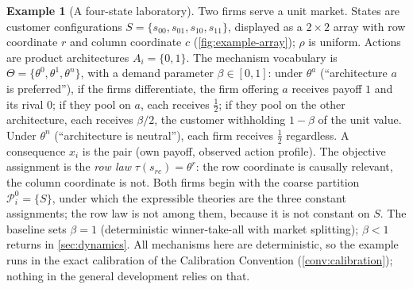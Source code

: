 \documentclass[11pt]{article}
\theoremstyle{definition}
\newtheorem{example}{Example}
\begin{document}
\begin{example}[A four-state laboratory]
\label{ex:setup}
Two firms serve a unit market.
States are customer configurations $S=\{s_{00},s_{01},s_{10},s_{11}\}$, displayed as a $2\times2$ array with row coordinate $r$ and column coordinate $c$ (\cref{fig:example-array}); $\rho$ is uniform.
Actions are product architectures $A_i=\{0,1\}$.
The mechanism vocabulary is $\Theta=\{\theta^0,\theta^1,\theta^n\}$, with a demand parameter $\beta\in[0,1]$: under $\theta^a$ (``architecture $a$ is preferred''), if the firms differentiate, the firm offering $a$ receives payoff $1$ and its rival $0$; if they pool on $a$, each receives $\tfrac12$; if they pool on the other architecture, each receives $\beta/2$, the customer withholding $1-\beta$ of the unit value.
Under $\theta^n$ (``architecture is neutral''), each firm receives $\tfrac12$ regardless.
A consequence $x_i$ is the pair (own payoff, observed action profile).
The objective assignment is the \emph{row law} $\tau(s_{rc})=\theta^{r}$: the row coordinate is causally relevant, the column coordinate is not.
Both firms begin with the coarse partition $\mathcal P_i^0=\{S\}$, under which the expressible theories are the three constant assignments; the row law is not among them, because it is not constant on $S$.
The baseline sets $\beta=1$ (deterministic winner-take-all with market splitting); $\beta<1$ returns in \cref{sec:dynamics}.
All mechanisms here are deterministic, so the example runs in the exact calibration of the Calibration Convention (\cref{conv:calibration}); nothing in the general development relies on that.
\end{example}
\end{document}
